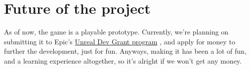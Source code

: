\documentclass[
  oneside,
  11pt, a4paper,
  footinclude=true,
  headinclude=true,
  cleardoublepage=empty
]{scrbook}
\begin{document}
\chapter{Future of the project}
As of now, the game is a playable prototype. Currently, we're planning on submitting it to Epic's \href{https://www.unrealengine.com/unrealdevgrants}{Unreal Dev Grant program} , and apply for money to further the development, just for fun. Anyways, making it has been a lot of fun, and a learning experience altogether, so it's alright if we won't get any money.
\end{document}
